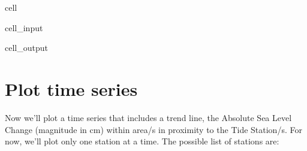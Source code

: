 \documentclass[letterpaper,10pt,english]{jupyterBook}
\begin{document}
\begin{sphinxuseclass}{cell}
\begin{sphinxVerbatimInput}
\begin{sphinxuseclass}{cell_input}
\end{sphinxuseclass}\end{sphinxVerbatimInput}
\begin{sphinxVerbatimOutput}

\begin{sphinxuseclass}{cell_output}
\noindent{}

\end{sphinxuseclass}\end{sphinxVerbatimOutput}

\end{sphinxuseclass}

\section{Plot time series}
\label{\detokenize{notebooks/regional_and_local/SL_Trend:plot-time-series}}\label{\detokenize{notebooks/regional_and_local/SL_Trend:asltimeseries}}
\sphinxAtStartPar
Now we’ll plot a time series that includes a trend line, the Absolute Sea Level Change (magnitude in cm) within area/s in proximity to the Tide Station/s. For now, we’ll plot only one station at a time. The possible list of stations are:
\end{document}

